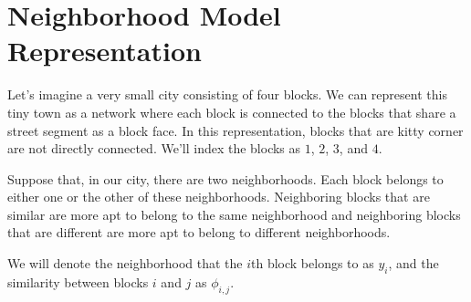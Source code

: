 \section*{Neighborhood Model Representation}
Let's imagine a very small city consisting of four blocks. We can
represent this tiny town as a network where each block is connected
to the blocks that share a street segment as a block face. In this
representation, blocks that are kitty corner are not directly
connected. We'll index the blocks as $1$, $2$, $3$, and $4$.

\begin{figure}[h]
\centering
{}
\end{figure}

\begin{figure}[h]
\centering


\end{figure}

Suppose that, in our city, there are two neighborhoods. Each block
belongs to either one or the other of these neighborhoods. Neighboring
blocks that are similar are more apt to belong to the same
neighborhood and neighboring blocks that are different are more apt to
belong to different neighborhoods. 

We will denote the neighborhood that the $i$th block belongs to as
$y_i$, and the similarity between blocks $i$ and $j$ as $\phi_{i,j}$.

\begin{figure}[!h]
\centering


\end{figure}

